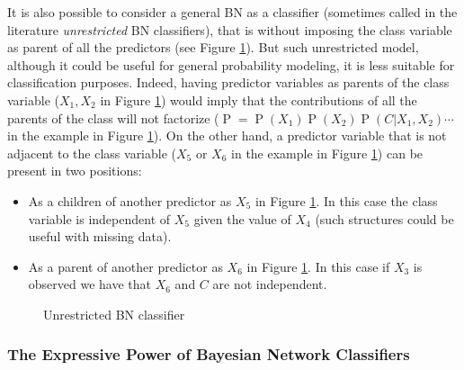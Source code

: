 \documentclass[11pt,a4paper, twoside]{book}
\newcommand{\Pp}{\operatorname{P}}
\begin{document}
It is also possible to consider a general BN as a classifier (sometimes called in the literature \textit{unrestricted} BN classifiers), that is without imposing the class variable as parent of all the predictors (see Figure \ref{fig:unrestricted}).  But such unrestricted model, although it  could be useful for general probability modeling, it is less suitable for classification purposes. 
Indeed, having predictor variables as parents of the class variable ($X_1, X_2$ in Figure \ref{fig:unrestricted}) would imply that the contributions of all the parents of the class will not factorize ($\Pp = \Pp(X_1)\Pp(X_2)\Pp(C|X_1,X_2)\cdots$ in the example in Figure \ref{fig:unrestricted}). 
On the other hand, a predictor variable that is not adjacent to the class variable ($X_5$ or $X_6$ in the example in Figure \ref{fig:unrestricted}) can be present in two positions:
\begin{itemize}
\item As a children of another predictor as $X_5$ in Figure \ref{fig:unrestricted}.
 In this case the class variable is independent of $X_5$ given the value of $X_4$ (such structures could be useful with missing data).
\item As a parent of another predictor as $X_6$ in Figure \ref{fig:unrestricted}. In this case if $X_3$ is observed we have that $X_6$ and $C$ are not independent.
\end{itemize}

\begin{figure}[h!]
\centering
{}  
\caption{Unrestricted BN classifier}
\label{fig:unrestricted}
\end{figure}


\subsubsection{The Expressive Power of Bayesian Network Classifiers}
\end{document}
